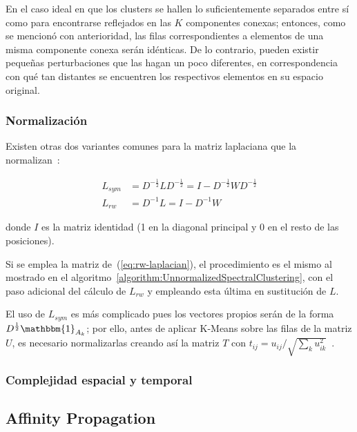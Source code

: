 En el caso ideal en que los clusters se hallen lo suficientemente separados entre sí como para encontrarse reflejados en las $K$ componentes conexas;
entonces, como se mencionó con anterioridad, las filas correspondientes a elementos de una misma componente conexa serán idénticas.
De lo contrario, pueden existir pequeñas perturbaciones que las hagan un poco diferentes, en correspondencia con qué tan distantes se encuentren los respectivos elementos en su espacio original.

\subsubsection{Normalización}

Existen otras dos variantes comunes para la matriz laplaciana que la normalizan~\cite{Aggarawal13}:

\begin{align}
    \label{eq:sym-laplacian}
    L_{sym} & = D^{-\frac{1}{2}}LD^{-\frac{1}{2}} = I - D^{-\frac{1}{2}} W D^{-\frac{1}{2}} \\
    \label{eq:rw-laplacian}
    L_{rw} & = D^{-1}L = I - D^{-1}W
\end{align}

\noindent donde $I$ es la matriz identidad (1 en la diagonal principal y 0 en el resto de las posiciones).

Si se emplea la matriz de~(\ref{eq:rw-laplacian}), el procedimiento es el mismo al mostrado en el algoritmo~\ref{algorithm:UnnormalizedSpectralClustering}, con el paso adicional del cálculo de $L_{rw}$ y empleando esta última en sustitución de $L$.

El uso de $L_{sym}$ es más complicado pues los vectores propios serán de la forma $D^{\frac{1}{2}}\mathbbm{1}_{A_k}$; por ello, antes de aplicar K-Means sobre las filas de la matriz $U$, es necesario normalizarlas creando así la matriz $T$ con $t_{ij} = u_{ij}/\sqrt{\sum_{k}{u_{ik}^2}}$~\cite{Murphy12}.

\subsubsection{Complejidad espacial y temporal}


\subsection{Affinity Propagation}\label{subsec:affinityPropagation}

